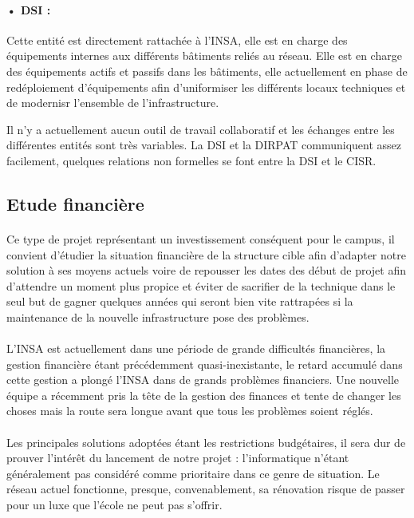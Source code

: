 \paragraph{• DSI :} Cette entité est directement rattachée à l'INSA, elle est en charge des équipements internes aux différents bâtiments reliés au réseau. Elle est en charge des équipements actifs et passifs dans les bâtiments, elle actuellement en phase de redéploiement d'équipements afin d'uniformiser les différents locaux techniques et de modernisr l'ensemble de l'infrastructure.

Il n'y a actuellement aucun outil de travail collaboratif et les échanges entre les différentes entités sont très variables. La DSI et la DIRPAT communiquent assez facilement, quelques relations non formelles se font entre la DSI et le CISR.


\subsection{Etude financière}

\paragraph{} Ce type de projet représentant un investissement conséquent pour le campus, il convient d'étudier la situation financière de la structure cible afin d'adapter notre solution à ses moyens actuels voire de repousser les dates des début de projet afin d'attendre un moment plus propice et éviter de sacrifier de la technique dans le seul but de gagner quelques années qui seront bien vite rattrapées si la maintenance de la nouvelle infrastructure pose des problèmes.

\paragraph{} L'INSA est actuellement dans une période de grande difficultés financières, la gestion financière étant précédemment quasi-inexistante, le retard accumulé dans cette gestion a plongé l'INSA dans de grands problèmes financiers. Une nouvelle équipe a récemment pris la tête de la gestion des finances et tente de changer les choses mais la route sera longue avant que tous les problèmes soient réglés.

\paragraph{} Les principales solutions adoptées étant les restrictions budgétaires, il sera dur de prouver l'intérêt du lancement de notre projet : l'informatique n'étant généralement pas considéré comme prioritaire dans ce genre de situation. Le réseau actuel fonctionne, presque, convenablement, sa rénovation risque de passer pour un luxe que l'école ne peut pas s'offrir. 

